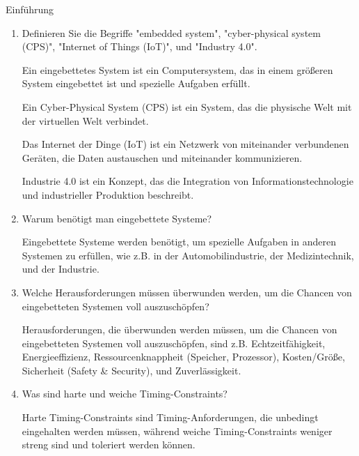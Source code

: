 \documentclass{article}
\begin{document}
\begin{exercise}{Einführung}
  \begin{enumerate}
    \item Definieren Sie die Begriffe "embedded system", "cyber-physical system (CPS)", "Internet of Things (IoT)", und "Industry 4.0".

          \begin{solution}
            Ein eingebettetes System ist ein Computersystem, das in einem größeren System eingebettet ist und spezielle Aufgaben erfüllt.

            Ein Cyber-Physical System (CPS) ist ein System, das die physische Welt mit der virtuellen Welt verbindet.

            Das Internet der Dinge (IoT) ist ein Netzwerk von miteinander verbundenen Geräten, die Daten austauschen und miteinander kommunizieren.

            Industrie 4.0 ist ein Konzept, das die Integration von Informationstechnologie und industrieller Produktion beschreibt.
          \end{solution}

    \item Warum benötigt man eingebettete Systeme?

          \begin{solution}
            Eingebettete Systeme werden benötigt, um spezielle Aufgaben in anderen Systemen zu erfüllen, wie z.B. in der Automobilindustrie, der Medizintechnik, und der Industrie.
          \end{solution}

    \item Welche Herausforderungen müssen überwunden werden, um die Chancen von eingebetteten Systemen voll auszuschöpfen?

          \begin{solution}
            Herausforderungen, die überwunden werden müssen, um die Chancen von eingebetteten Systemen voll auszuschöpfen, sind z.B. Echtzeitfähigkeit, Energieeffizienz, Ressourcenknappheit (Speicher, Prozessor), Kosten/Größe, Sicherheit (Safety \& Security), und Zuverlässigkeit.
          \end{solution}

    \item Was sind harte und weiche Timing-Constraints?

          \begin{solution}
            Harte Timing-Constraints sind Timing-Anforderungen, die unbedingt eingehalten werden müssen, während weiche Timing-Constraints weniger streng sind und toleriert werden können.
          \end{solution}


\end{enumerate}
\end{exercise}
\end{document}
